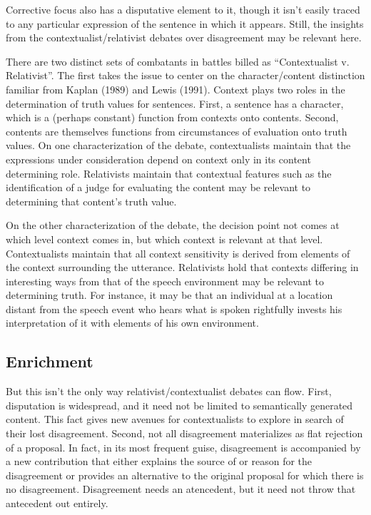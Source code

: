 \documentclass[letterpaper,10pt]{article}
\begin{document}
Corrective focus also has a disputative element to it, though it isn't easily traced to any particular expression of the sentence in which it appears.  Still, the insights from the contextualist/relativist debates over disagreement may be relevant here.

There are two distinct sets of combatants in battles billed as ``Contextualist v. Relativist''.  The first takes the issue to center on the character/content distinction familiar from Kaplan (1989) and Lewis (1991).  Context plays two roles in the determination of truth values for sentences.  First, a sentence has a character, which is a (perhaps constant) function from contexts onto contents.  Second, contents are themselves functions from circumstances of evaluation onto truth values.  On one characterization of the debate, contextualists maintain that the expressions under consideration depend on context only in its content determining role.  Relativists maintain that contextual features such as the identification of a judge for evaluating the content may be relevant to determining that content's truth value.

On the other characterization of the debate, the decision point not comes at which level context comes in, but which context is relevant at that level.  Contextualists maintain that all context sensitivity is derived from elements of the context surrounding the utterance.  Relativists hold that contexts differing in interesting ways from that of the speech environment may be relevant to determining truth.  For instance, it may be that an individual at a location distant from the speech event who hears what is spoken rightfully invests his interpretation of it with elements of his own environment.

\subsection{Enrichment}
But this isn't the only way relativist/contextualist debates can flow.  First, disputation is widespread, and it need not be limited to semantically generated content.  This fact gives new avenues for contextualists to explore in search of their lost disagreement.  Second, not all disagreement materializes as flat rejection of a proposal.  In fact, in its most frequent guise, disagreement is accompanied by a new contribution that either explains the source of or reason for the disagreement or provides an alternative to the original proposal for which there is no disagreement. Disagreement needs an atencedent, but it need not throw that antecedent out entirely.
\end{document}
